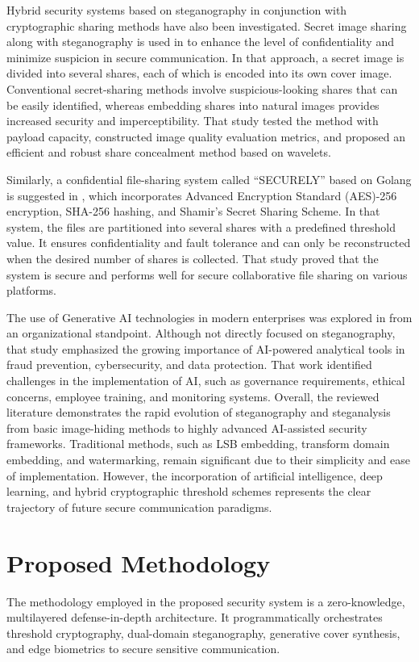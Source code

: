 \documentclass[conference]{IEEEtran}
\begin{document}
Hybrid security systems based on steganography in conjunction with cryptographic sharing methods have also been investigated. Secret image sharing along with steganography is used in \cite{kamble2018secret} to enhance the level of confidentiality and minimize suspicion in secure communication. In that approach, a secret image is divided into several shares, each of which is encoded into its own cover image. Conventional secret-sharing methods involve suspicious-looking shares that can be easily identified, whereas embedding shares into natural images provides increased security and imperceptibility. That study tested the method with payload capacity, constructed image quality evaluation metrics, and proposed an efficient and robust share concealment method based on wavelets.

Similarly, a confidential file-sharing system called ``SECURELY'' based on Golang is suggested in \cite{khandagale2023securely}, which incorporates Advanced Encryption Standard (AES)-256 encryption, SHA-256 hashing, and Shamir's Secret Sharing Scheme. In that system, the files are partitioned into several shares with a predefined threshold value. It ensures confidentiality and fault tolerance and can only be reconstructed when the desired number of shares is collected. That study proved that the system is secure and performs well for secure collaborative file sharing on various platforms.

The use of Generative AI technologies in modern enterprises was explored in \cite{alkfairy2025generative} from an organizational standpoint. Although not directly focused on steganography, that study emphasized the growing importance of AI-powered analytical tools in fraud prevention, cybersecurity, and data protection. That work identified challenges in the implementation of AI, such as governance requirements, ethical concerns, employee training, and monitoring systems. Overall, the reviewed literature demonstrates the rapid evolution of steganography and steganalysis from basic image-hiding methods to highly advanced AI-assisted security frameworks. Traditional methods, such as LSB embedding, transform domain embedding, and watermarking, remain significant due to their simplicity and ease of implementation. However, the incorporation of artificial intelligence, deep learning, and hybrid cryptographic threshold schemes represents the clear trajectory of future secure communication paradigms.

\section{Proposed Methodology}
The methodology employed in the proposed security system is a zero-knowledge, multilayered defense-in-depth architecture. It programmatically orchestrates threshold cryptography, dual-domain steganography, generative cover synthesis, and edge biometrics to secure sensitive communication.
\end{document}
